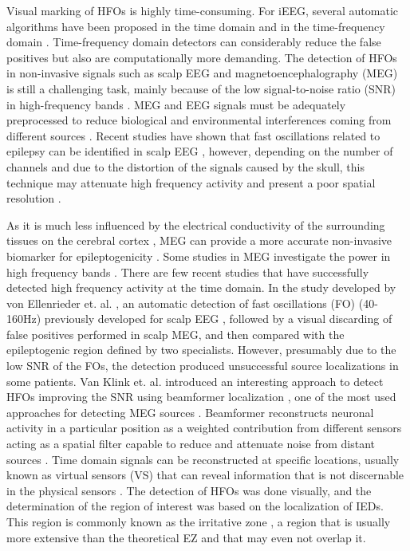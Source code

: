 Visual marking of HFOs is highly time-consuming. For iEEG, several automatic algorithms have been proposed in the time domain and in the time-frequency domain \citep{Liu2016,Burnos2014,vonEllenrieder2012,Zelmann2012}. Time-frequency domain detectors can considerably reduce the false positives but also are computationally more demanding. The detection of HFOs in non-invasive signals such as scalp EEG and magnetoencephalography (MEG) is still a challenging task, mainly because of the low signal-to-noise ratio (SNR) in high-frequency bands \citep{Muthukumaraswamy2013}. MEG and EEG signals must be adequately preprocessed to reduce biological and environmental interferences coming from different sources \citep{Stufflebeam2009}. Recent studies have shown that fast oscillations related to epilepsy can be identified in scalp EEG \citep{Andrade-Valenca2011,Melani2013,Fahoum2014,Zelmann2014}, however, depending on the number of channels and due to the distortion of the signals caused by the skull, this technique may attenuate high frequency activity and present a poor spatial resolution \citep{Zelmann2014}.

As it is much less influenced by the electrical conductivity of the surrounding tissues on the cerebral cortex \citep{Shibasaki2007}, MEG can provide a more accurate non-invasive biomarker for epileptogenicity \citep{Muthukumaraswamy2013}. Some studies in MEG investigate the power in high frequency bands \citep{Papadelis2016,Miao2014,Tenney2014}. There are few recent studies that have successfully detected high frequency activity at the time domain. In the study developed by von Ellenrieder et. al. \citep{vonEllenrieder2016}, an automatic detection of fast oscillations (FO) (40-160Hz) previously developed for  scalp EEG \citep{vonEllenrieder2012}, followed by a visual discarding of false positives performed in scalp MEG, and then compared with the epileptogenic region defined by two specialists. However, presumably due to the low SNR of the FOs, the detection produced unsuccessful source localizations in some patients. Van Klink et. al. introduced an interesting approach to detect HFOs improving the SNR using beamformer localization \citep{vanKlink2015}, one of the most used approaches for detecting MEG sources \citep{Baillet2001}. Beamformer reconstructs neuronal activity in a particular position as a weighted contribution from different sensors acting as a spatial filter capable to reduce and attenuate noise from distant sources \citep{Hillebrand2005,Vrba2002,Muthukumaraswamy2013}. Time domain signals can be reconstructed at specific locations, usually known as virtual sensors (VS) that can reveal information that is not discernable in the physical sensors \citep{vanKlink2015}. The detection of HFOs was done visually, and the determination of the region of interest was based on the localization of IEDs. This region is commonly known as the irritative zone \citep{Rosenow2001}, a region that is usually more extensive than the theoretical EZ and that may even not overlap it.

